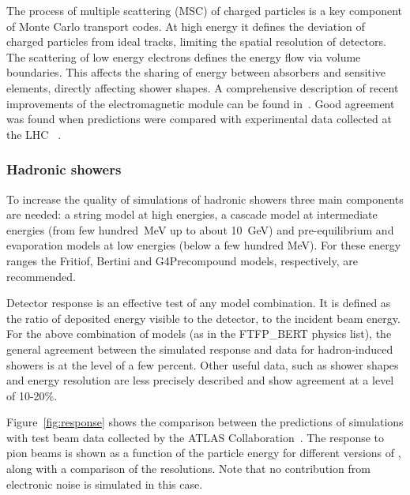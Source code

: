 The process of multiple scattering (MSC) of charged particles is a key component
of Monte Carlo transport codes.  At high energy it defines the deviation of 
charged particles from ideal tracks, limiting the spatial resolution of 
detectors.  The scattering of low energy electrons defines the energy flow via 
volume boundaries.  This affects the sharing of energy between absorbers and 
sensitive elements, directly affecting shower shapes.  A comprehensive 
description of recent improvements of the \Gfour{} electromagnetic module can be
found in~\cite{1742-6596-396-2-022013}.
Good agreement was found when \Gfour{} predictions were compared with 
experimental data collected at the LHC
~\cite{1748-0221-6-04-P04001}.

\subsubsection{Hadronic showers}
To increase the quality of simulations of hadronic showers three main components
are needed: a string model at high energies, a cascade model at intermediate 
energies (from few hundred~MeV up to about 10~GeV) and pre-equilibrium and 
evaporation models at low energies (below a few hundred MeV).  For these energy
ranges the Fritiof, Bertini and {\gclass G4Precompound} models, respectively, 
are recommended.

Detector response is an effective test of any model combination.  It is defined
as the ratio of deposited energy visible to the detector, to the incident beam 
energy.  For the above combination of models (as in the FTFP\_BERT physics list),
the general agreement between the simulated response and data for hadron-induced
showers is at the level of a few percent.  Other useful data, such as shower 
shapes and energy resolution are less precisely described and show agreement at
a level of 10-20\%.

Figure~\ref{fig:response} shows the comparison between the predictions of 
\Gfour{} simulations with test beam data collected by the ATLAS 
Collaboration~\cite{Kiryunin2006278}. The response to pion beams is shown as a 
function of the particle energy for different versions of \Gfour{}, along with 
a comparison of the resolutions.  Note that no contribution from electronic 
noise is simulated in this case. 

